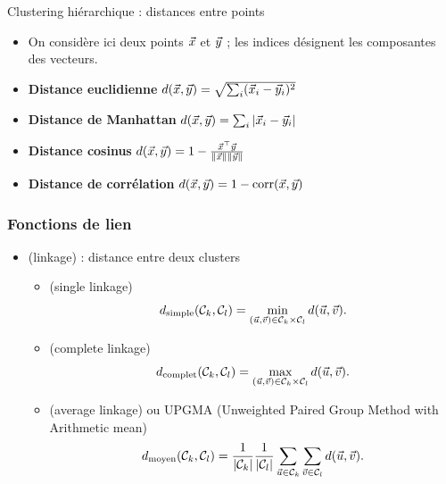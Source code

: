 \begin{frame}{Clustering hiérarchique : distances entre points}
\begin{itemize}
  \item On considère ici deux points $\vec{x}$ et $\vec{y}$ ; les indices désignent les composantes des vecteurs.
  \item \textbf{Distance euclidienne} $d(\vec{x},\vec{y}) = \sqrt{\sum_i (\vec{x}_i-\vec{y}_i)^2}$
  \item \textbf{Distance de Manhattan} $d(\vec{x},\vec{y}) = \sum_i |\vec{x}_i-\vec{y}_i|$
  \item \textbf{Distance cosinus} $d(\vec{x},\vec{y}) = 1 - \frac{\vec{x}^\top \vec{y}}{\|\vec{x}\|\|\vec{y}\|}$
  \item \textbf{Distance de corrélation} $d(\vec{x},\vec{y}) = 1 - \mathrm{corr}(\vec{x},\vec{y})$
\end{itemize}
\end{frame}



\begin{frame}
  \frametitle{Fonctions de lien}
  \begin{itemize}
  \item {} \textcolor{gray!70}{(linkage)} : distance entre deux clusters
    \begin{itemize}
    \item {} \textcolor{gray!70}{(single linkage)}
      \[ d_{\text{simple}}(\mathcal{C}_k, \mathcal{C}_l) = \min_{(\vec{u}, \vec{v}) \in \mathcal{C}_k \times \mathcal{C}_l } d(\vec{u}, \vec{v}).
      \]
      \pause
    \item {} \textcolor{gray!70}{(complete linkage)}
      \[
        d_{\text{complet}}(\mathcal{C}_k, \mathcal{C}_l) = \max_{(\vec{u}, \vec{v}) \in \mathcal{C}_k \times \mathcal{C}_l} d(\vec{u}, \vec{v}).
      \]
      \pause
    \item {} \textcolor{gray!70}{(average linkage)} ou UPGMA \textcolor{gray!70}{(Unweighted Paired Group Method with Arithmetic mean)}
      \[
        d_{\text{moyen}}(\mathcal{C}_k, \mathcal{C}_l) = \frac1{\lvert \mathcal{C}_k \rvert} 
        \frac1{\lvert \mathcal{C}_l \rvert}
        \sum_{\vec{u} \in \mathcal{C}_k}\sum_{\vec{v} \in \mathcal{C}_l} d(\vec{u}, \vec{v}).
      \]
    \end{itemize}
  \end{itemize}
\end{frame}

